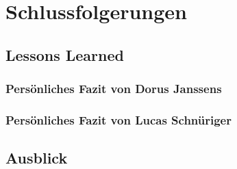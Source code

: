 \section{Schlussfolgerungen}

\subsection{Lessons Learned}

\subsubsection{Persönliches Fazit von Dorus Janssens}

\subsubsection{Persönliches Fazit von Lucas Schnüriger}


\subsection{Ausblick}


